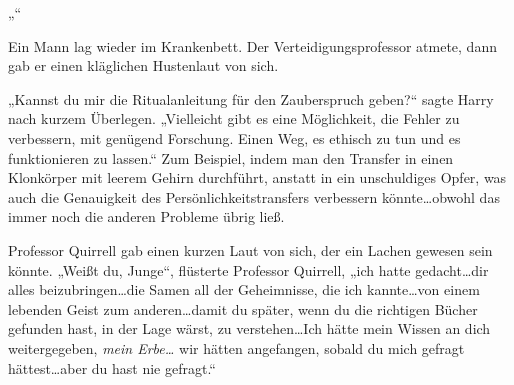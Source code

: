 „“

Ein Mann lag wieder im Krankenbett. Der Verteidigungsprofessor atmete, dann gab er einen kläglichen Hustenlaut von sich.

„Kannst du mir die Ritualanleitung für den Zauberspruch geben?“ sagte Harry nach kurzem Überlegen. „Vielleicht gibt es eine Möglichkeit, die Fehler zu verbessern, mit genügend Forschung. Einen Weg, es ethisch zu tun und es funktionieren zu lassen.“
Zum Beispiel, indem man den Transfer in einen Klonkörper mit leerem Gehirn durchführt, anstatt in ein unschuldiges Opfer, was auch die Genauigkeit des Persönlichkeitstransfers verbessern könnte…obwohl das immer noch die anderen Probleme übrig ließ.

Professor Quirrell gab einen kurzen Laut von sich, der ein Lachen gewesen sein könnte. „Weißt du, Junge“, flüsterte Professor Quirrell, „ich hatte gedacht…dir alles beizubringen…die Samen all der Geheimnisse, die ich kannte…von einem lebenden Geist zum anderen…damit du später, wenn du die richtigen Bücher gefunden hast, in der Lage wärst, zu verstehen…Ich hätte mein Wissen an dich weitergegeben, \emph{mein Erbe…} wir hätten angefangen, sobald du mich gefragt hättest…aber du hast nie gefragt.“

